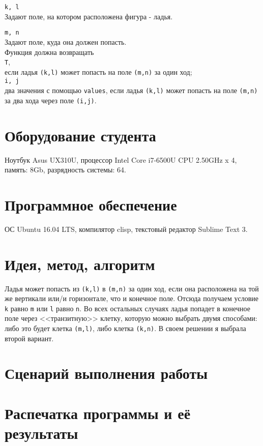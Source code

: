 \documentclass[12pt]{article}
\begin{document}
{\tt k, l}\\
Задают поле, на котором расположена фигура - ладья.

{\tt m, n}\\
Задают поле, куда она должен попасть.\\

Функция должна возвращать\\
{\tt T},\\
если ладья {\tt (k,l)} может попасть на поле {\tt (m,n)} за один ход;\\

{\tt i, j}\\
два значения с помощью {\tt values}, если ладья {\tt (k,l)} может попасть на поле {\tt (m,n)} за два хода через поле {\tt (i,j)}.



\section{Оборудование студента}
Ноутбук Asus UX310U, процессор Intel Core i7-6500U CPU 2.50GHz x 4, память: 8Gb, разрядность системы: 64.

\section{Программное обеспечение}
ОС Ubuntu 16.04 LTS, компилятор clisp, текстовый редактор Sublime Text 3.

\section{Идея, метод, алгоритм}
Ладья может попасть из {\tt (k,l)} в {\tt (m,n)} за один ход, если она расположена на той же вертикали или/и горизонтале, что и конечное поле. Отсюда получаем условие  {\tt k} равно  {\tt m} или {\tt l} равно {\tt n}. Во всех остальных случаях ладья попадет в конечное поле через <<транзитную>> клетку, которую можно выбрать двумя способами: либо это будет клетка {\tt (m,l)}, либо клетка  {\tt (k,n)}. В своем решении я выбрала второй вариант. 

\section{Сценарий выполнения работы}

\section{Распечатка программы и её результаты}
\end{document}
